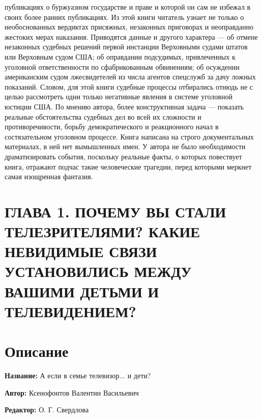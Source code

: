 \documentclass[12pt, a4paper, openany]{book}
\begin{document}
публикациях о буржуазном государстве и праве и которой он сам 
не избежал в своих более ранних публикациях. Из этой 
книги читатель узнает не только о необоснованных  
вердиктах присяжных, незаконных приговорах и неоправданно 
жестоких мерах наказания. Приводятся данные и другого 
характера — об отмене незаконных судебных решений 
первой инстанции Верховными судами штатов или  
Верховным судом США; об оправдании подсудимых,  
привлеченных к уголовной ответственности по сфабрикованным 
обвинениям; об осуждении американским судом  
лжесвидетелей из числа агентов спецслужб за дачу ложных 
показаний. Словом, для этой книги судебные процессы 
отбирались отнюдь не с целью рассмотреть одни только 
негативные явления в системе уголовной юстиции США. По 
мнению автора, более конструктивная задача — показать 
реальные обстоятельства судебных дел во всей их  
сложности и противоречивости, борьбу демократического и  
реакционного начал в состязательном уголовном процессе. 
Книга написана на строго документальных материалах, 
в ней нет вымышленных имен. У автора не было  
необходимости драматизировать события, поскольку реальные  
факты, о которых повествует книга, отражают подчас такие 
человеческие трагедии, перед которыми меркнет самая 
изощренная фантазия. 


\newpage

	\section[Глава первая. Почему вы стали телезрителями? Какие невидимые связи установились между вашими детьми и телевидением?]{\center \textbf{ГЛАВА 1. ПОЧЕМУ ВЫ СТАЛИ ТЕЛЕЗРИТЕЛЯМИ? КАКИЕ НЕВИДИМЫЕ СВЯЗИ УСТАНОВИЛИСЬ МЕЖДУ ВАШИМИ ДЕТЬМИ И ТЕЛЕВИДЕНИЕМ? }}
	
	
	\newpage
	\tableofcontents
	
	\thispagestyle{empty} %
	
	\newpage
	
	\setcounter{secnumdepth}{0}
	
	
		\section*{Описание}
	
	{\bf Название:} А если в семье телевизор... и дети?
	
{\bf Автор:} Ксенофонтов Валентин Васильевич

{\bf Редактор:} О. Г. Свердлова
	
\end{document}
